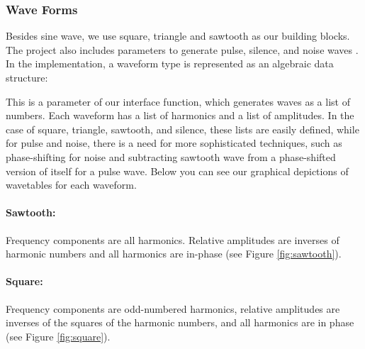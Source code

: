 \documentclass[runningheads]{llncs}
\begin{document}
\subsubsection{Wave Forms}
Besides sine wave, we use square, triangle and sawtooth as our building blocks. The project also includes parameters to generate pulse, silence, and noise waves \cite{waveformRef}.
In the implementation, a waveform type is represented as an algebraic data structure: 

\begin{center}\vspace{\baselineskip} 
\end{center} 

This is a parameter of our interface function, which generates waves as a list of  numbers.
Each waveform has a list of harmonics and a list of amplitudes. In the case of square, triangle, sawtooth, and silence, these lists are easily defined, while for pulse and noise, there is a need for more sophisticated techniques, such as phase-shifting for noise and subtracting sawtooth wave from a phase-shifted version of itself for a pulse wave. Below you can see our graphical depictions of wavetables for each waveform.






\paragraph{\textbf{Sawtooth:}} Frequency components are all harmonics. Relative amplitudes are inverses of harmonic numbers and all 
harmonics are in-phase (see Figure \ref{fig:sawtooth}).

\paragraph{\textbf{Square:}} Frequency components are odd-numbered harmonics, relative amplitudes are inverses of the squares of the harmonic numbers, and all harmonics are in phase (see Figure \ref{fig:square}).
\end{document}
